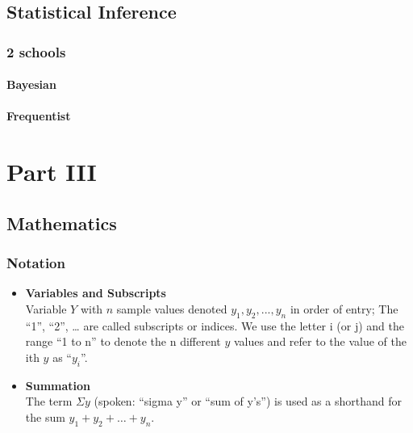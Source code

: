 \documentclass[]{book}
\begin{document}
\hypertarget{inference}{%
\chapter{Statistical Inference}\label{inference}}

\hypertarget{schools}{%
\section{2 schools}\label{schools}}

\hypertarget{bayesian}{%
\subsection{Bayesian}\label{bayesian}}

\hypertarget{frequentist}{%
\subsection{Frequentist}\label{frequentist}}

\hypertarget{part-part-iii}{%
\part{Part III}\label{part-part-iii}}

\hypertarget{math}{%
\chapter{Mathematics}\label{math}}

\hypertarget{notation}{%
\section{Notation}\label{notation}}

\begin{itemize}
\item
  \textbf{Variables and Subscripts}\\
  Variable \(Y\) with \(n\) sample values denoted \(y_1, y_2, ..., y_n\) in order of entry; The ``1'', ``2'', \ldots{} are called subscripts or indices. We use the letter i (or j) and the range ``1 to n'' to denote the n different \(y\) values and refer to the value of the ith \(y\) as ``\(y_i\)''.
\item
  \textbf{Summation}\\
  The term \(\Sigma y\) (spoken: ``sigma y'' or ``sum of y's'') is used as a shorthand for the sum \(y_1 + y_2 + \dots + y_n\).
\end{itemize}
\end{document}
